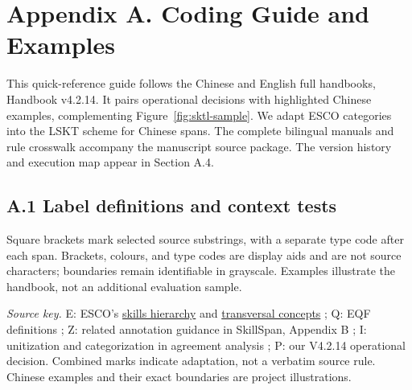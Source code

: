 \newcommand{\gspan}[2]{{\setlength{\fboxsep}{1.4pt}\colorbox{guide#1}{\strut [#2]\,\textsf{[#1]}}}}
\newcommand{\gcontext}[1]{\textcolor{black!75}{#1}}
\newcommand{\gsource}[1]{\,\textsuperscript{\textsf{[#1]}}}

\section{Appendix A. Coding Guide and Examples}
\label{app:a}
\label{sec:handbook-current}
This quick-reference guide follows the Chinese and English full handbooks, Handbook v4.2.14. It pairs operational decisions with highlighted Chinese examples, complementing Figure~\ref{fig:sktl-sample}. We adapt ESCO categories into the LSKT scheme for Chinese spans. The complete bilingual manuals and rule crosswalk accompany the manuscript source package. The version history and execution map appear in Section A.4.

\subsection{A.1 Label definitions and context tests}
Square brackets mark selected source substrings, with a separate type code after each span. Brackets, colours, and type codes are display aids and are not source characters; boundaries remain identifiable in grayscale. Examples illustrate the handbook, not an additional evaluation sample.

\noindent\textit{Source key.} E: ESCO's \href{https://esco.ec.europa.eu/en/about-esco/escopedia/escopedia/skills-pillar}{skills hierarchy} and \href{https://esco.ec.europa.eu/en/about-esco/escopedia/escopedia/transversal-knowledge-skills-and-competences}{transversal concepts} \citep{ESCOv1_2_2024}; Q: EQF definitions \citep{council2017eqf}; Z: related annotation guidance in SkillSpan, Appendix B \citep{zhang2022skillspan}; I: unitization and categorization in agreement analysis \citep{artstein2008agreement}; P: our V4.2.14 operational decision. Combined marks indicate adaptation, not a verbatim source rule. Chinese examples and their exact boundaries are project illustrations.

